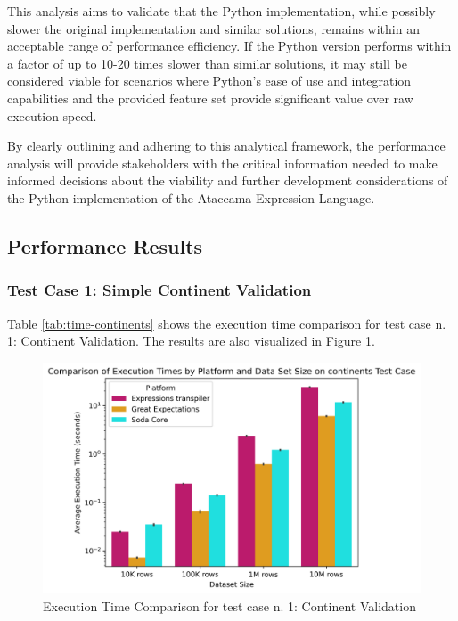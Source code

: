 This analysis aims to validate that the Python implementation, while possibly slower the original implementation and similar solutions, remains within an acceptable range of performance efficiency. If the Python version performs within a factor of up to 10-20 times slower than similar solutions, it may still be considered viable for scenarios where Python’s ease of use and integration capabilities and the provided feature set provide significant value over raw execution speed. 

By clearly outlining and adhering to this analytical framework, the performance analysis will provide stakeholders with the critical information needed to make informed decisions about the viability and further development considerations of the Python implementation of the Ataccama Expression Language.

\subsection{Performance Results}

\subsubsection{Test Case 1: Simple Continent Validation}

Table \ref{tab:time-continents} shows the execution time comparison for test case n. 1: Continent Validation. The results are also visualized in Figure \ref{fig:time-comparison-continents}.

\begin{table}[h] 
    \footnotesize
    \centering 
    \caption{Execution Time Comparison for test case n. 1: Continent Validation} 
    \label{tab:time-continents} 
    
\end{table}

\begin{figure}[htbp]
  \centering
  \includegraphics[width=1.0\columnwidth]{result-analysis/plots/execution_time_comparison_continents.png}
  \caption{Execution Time Comparison for test case n. 1: Continent Validation}
  \label{fig:time-comparison-continents}
\end{figure}


